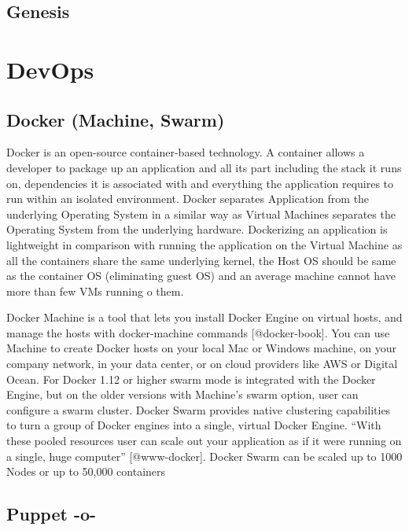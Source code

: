 \subsection{Genesis}

\section{DevOps}

\subsection{Docker (Machine, Swarm)}

Docker is an open-source container-based technology. A container
allows a developer to package up an application and all its part
including the stack it runs on, dependencies it is associated with and
everything the application requires to run within an isolated
environment. Docker separates Application from the underlying
Operating System in a similar way as Virtual Machines separates the
Operating System from the underlying hardware. Dockerizing an
application is lightweight in comparison with running the application
on the Virtual Machine as all the containers share the same underlying
kernel, the Host OS should be same as the container OS (eliminating
guest OS) and an average machine cannot have more than few VMs running
o them.

Docker Machine is a tool that lets you install Docker Engine on
virtual hosts, and manage the hosts with docker-machine commands
[@docker-book]. You can use Machine to create Docker hosts on
your local Mac or Windows machine, on your company network, in your
data center, or on cloud providers like AWS or Digital Ocean. For
Docker 1.12 or higher swarm mode is integrated with the Docker Engine,
but on the older versions with Machine's swarm option, user can
configure a swarm cluster. Docker Swarm provides native clustering
capabilities to turn a group of Docker engines into a single, virtual
Docker Engine. ``With these pooled resources user can scale out your
application as if it were running on a single, huge computer''
[@www-docker]. Docker Swarm can be scaled up to 1000 Nodes or up
to 50,000 containers
     
\subsection{Puppet -o-}

